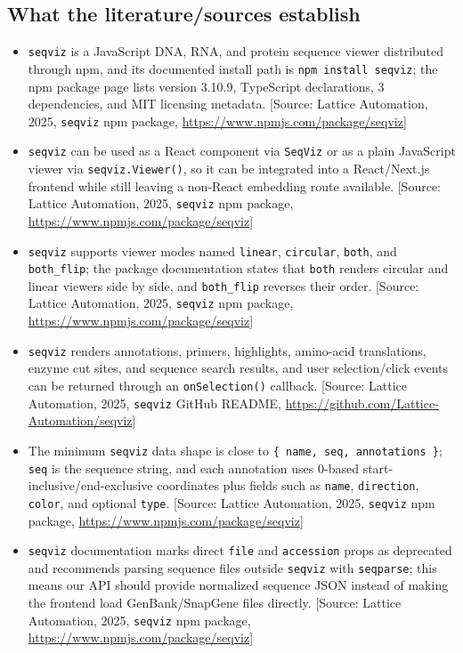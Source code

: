 \documentclass[11pt]{report}
\begin{document}
\subsection{What the literature/sources establish}
\begin{itemize}
\item \texttt{seqviz} is a JavaScript DNA, RNA, and protein sequence viewer distributed through npm, and its documented install path is \texttt{npm install seqviz}; the npm package page lists version 3.10.9, TypeScript declarations, 3 dependencies, and MIT licensing metadata. [Source: Lattice Automation, 2025, \texttt{seqviz} npm package, \url{https://www.npmjs.com/package/seqviz}]
\item \texttt{seqviz} can be used as a React component via \texttt{SeqViz} or as a plain JavaScript viewer via \texttt{seqviz.Viewer()}, so it can be integrated into a React/Next.js frontend while still leaving a non-React embedding route available. [Source: Lattice Automation, 2025, \texttt{seqviz} npm package, \url{https://www.npmjs.com/package/seqviz}]
\item \texttt{seqviz} supports viewer modes named \texttt{linear}, \texttt{circular}, \texttt{both}, and \texttt{both\_flip}; the package documentation states that \texttt{both} renders circular and linear viewers side by side, and \texttt{both\_flip} reverses their order. [Source: Lattice Automation, 2025, \texttt{seqviz} npm package, \url{https://www.npmjs.com/package/seqviz}]
\item \texttt{seqviz} renders annotations, primers, highlights, amino-acid translations, enzyme cut sites, and sequence search results, and user selection/click events can be returned through an \texttt{onSelection()} callback. [Source: Lattice Automation, 2025, \texttt{seqviz} GitHub README, \url{https://github.com/Lattice-Automation/seqviz}]
\item The minimum \texttt{seqviz} data shape is close to \texttt{\{ name, seq, annotations \}}; \texttt{seq} is the sequence string, and each annotation uses 0-based start-inclusive/end-exclusive coordinates plus fields such as \texttt{name}, \texttt{direction}, \texttt{color}, and optional \texttt{type}. [Source: Lattice Automation, 2025, \texttt{seqviz} npm package, \url{https://www.npmjs.com/package/seqviz}]
\item \texttt{seqviz} documentation marks direct \texttt{file} and \texttt{accession} props as deprecated and recommends parsing sequence files outside \texttt{seqviz} with \texttt{seqparse}; this means our API should provide normalized sequence JSON instead of making the frontend load GenBank/SnapGene files directly. [Source: Lattice Automation, 2025, \texttt{seqviz} npm package, \url{https://www.npmjs.com/package/seqviz}]

\end{itemize}
\end{document}
